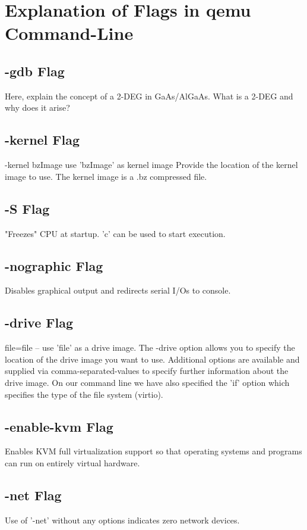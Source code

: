 \documentclass{article}
\begin{document}
\section{Explanation of Flags in qemu Command-Line}
\label{sec:flags}

\subsection{-gdb Flag}
Here, explain the concept of a 2-DEG in GaAs/AlGaAs. What is a 2-DEG and why does it arise?

\subsection{-kernel Flag}
-kernel bzImage use 'bzImage' as kernel image
Provide the location of the kernel image to use. The kernel image is a .bz compressed file.

\subsection{-S Flag}
"Freezes" CPU at startup. 'c' can be used to start execution.

\subsection{-nographic Flag}
Disables graphical output and redirects serial I/Os to console.  

\subsection{-drive Flag}
file=file -- use 'file' as a drive image.
The -drive option allows you to specify the location of the drive image you want to use. Additional options are available and supplied via comma-separated-values to specify further information about the drive image. On our command line we have also specified the 'if' option which specifies the type of the file system (virtio).

\subsection{-enable-kvm Flag}
Enables KVM full virtualization support so that operating systems and programs can run on entirely virtual hardware.

\subsection{-net Flag}
Use of '-net' without any options indicates zero network devices.
\end{document}
